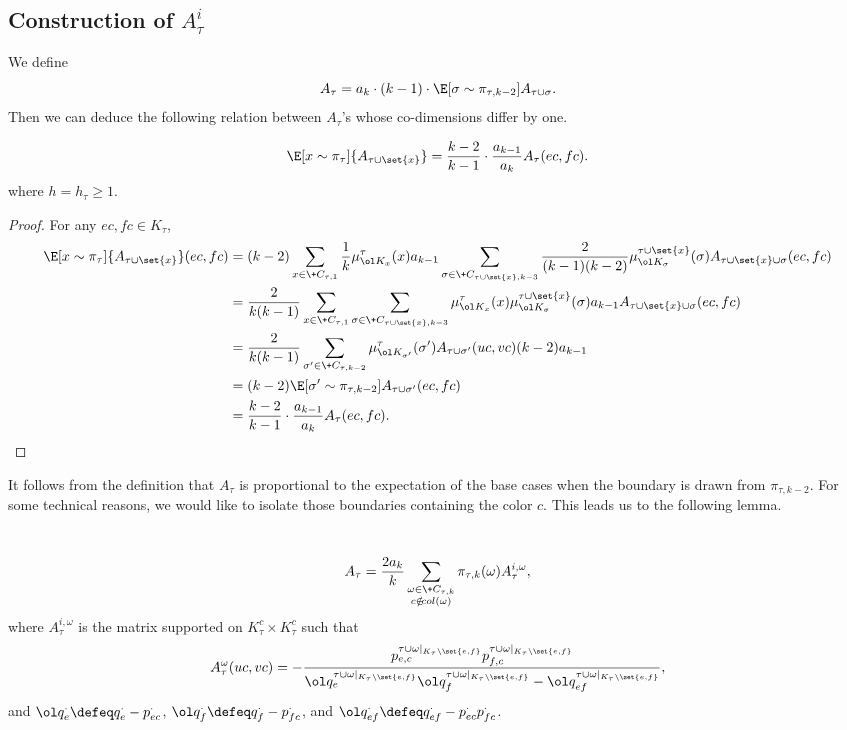 \documentclass[a4paper,11pt]{article}
\begin{document}
\subsection{Construction of $A_\tau^i$}\label{sss:Atau}
We define
\begin{equation}\label{eqn:A-def}
	A_\tau = a_{k}\cdot (k-1)\cdot \E[\sigma\sim \pi_{\tau, k-2}]{A_{\tau\cup\sigma}}.
\end{equation}
Then we can deduce the following relation between $A_\tau$'s whose co-dimensions differ by one.
\begin{lemma}
	\[
		\E[x\sim \pi_\tau]{A_{\tau\cup\set{x}}} = \frac{k-2}{k-1}\cdot \frac{a_{k-1}}{a_{k}} A_\tau(ec, fc).
	\]
	where $h = h_\tau \geq 1$.
\end{lemma}
\begin{proof}
For any $ec, fc \in K_\tau$,
	\begin{align*}
		\E[x\sim \pi_\tau]{A_{\tau\cup\set{x}}}(ec, fc)
        &= (k-2)\sum_{x\in \+C_{\tau,1}} \frac{1}{k} \mu_{\ol K_x}^\tau(x) a_{k-1} \sum_{\sigma\in \+C_{\tau\cup\set{x}, k-3}} \frac{2}{(k-1)(k-2)}\mu^{\tau\cup\set{x}}_{\ol K_\sigma}(\sigma) A_{\tau\cup\set{x}\cup\sigma}(ec, fc)\\
		&= \frac{2}{k(k-1)} \sum_{x\in \+C_{\tau,1}}\sum_{\sigma\in \+C_{\tau\cup\set{x}, k-3}}\mu^{\tau}_{\ol K_x}(x) \mu^{\tau\cup\set{x}}_{\ol K_\sigma}(\sigma)a_{k-1}A_{\tau\cup\set{x}\cup\sigma}(ec, fc)\\
		&= \frac{2}{k(k-1)} \sum_{\sigma'\in \+C_{\tau,k-2}} \mu^\tau_{\ol K_{\sigma'}}(\sigma') A_{\tau\cup\sigma'}(uc, vc) (k-2)a_{k-1}\\
        &= (k-2)\E[\sigma'\sim \pi_{\tau, k-2}]{A_{\tau\cup\sigma'}(ec, fc)}\\
		&= \frac{k-2}{k-1}\cdot \frac{a_{k-1}}{a_{k}} A_\tau(ec, fc).
	\end{align*}
\end{proof}

It follows from the definition that $A_\tau$ is proportional to the expectation of the base cases when the boundary is drawn from $\pi_{\tau,k-2}$. For some technical reasons, we would like to isolate those boundaries containing the color $c$. This leads us to the following lemma.

\begin{lemma}~\label{lem:A-tau-i}
    \newcommand{\taur}{\tau\cup\omega|_{K_\tau\setminus\set{e, f}}}
	\[
		A_\tau = \frac{2a_k}{k}\sum_{\substack{\omega\in \+C_{\tau,k}\\ c\notin\!{col}(\omega)}}\pi_{\tau,k}(\omega)A^{i,\omega}_\tau,
	\]
	where $A^{i,\omega}_\tau$ is the matrix supported on $K_\tau^c\times K_\tau^c$ such that
	\[
		A_\tau^{\omega}(uc,vc) = -\frac{p^{\taur}_{e, c}p^{\taur}_{f, c}}{\ol q^{\taur}_{e}\ol q^{\taur}_{f} - \ol q^{\taur}_{ef}}, 
	\]
	and $\ol q^{\cdot}_{e}\defeq q^\cdot_{e} - p^\cdot_{ec}$,
    $\ol q^{\cdot}_{f}\defeq q^\cdot_{f} - p^\cdot_{fc}$, and
    $\ol q^{\cdot}_{ef}\defeq q^\cdot_{ef} - p^\cdot_{ec}p^\cdot_{fc}$.
\end{lemma}
\end{document}
